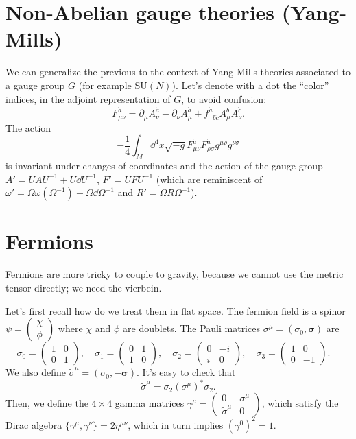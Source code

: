 \documentclass[a4paper,12pt]{book}
\begin{document}
\section{Non-Abelian gauge theories (Yang-Mills)}
We can generalize the previous to the context of Yang-Mills theories associated to a gauge group $G$ (for example $\text{SU}(N)$). Let's denote with a dot the ``color'' indices, in the adjoint representation of $G$, to avoid confusion:
\[F^{\dot a}_{\mu\nu}=\partial_\mu A^{\dot a}_\nu-\partial_\nu A^{\dot a}_\mu+f^{\dot a}{}_{\dot b\dot c}A^{\dot b}_\mu A^{\dot c}_\nu.\]
The action
\[-\frac{1}{4}\int_M\dd^4x\sqrt{-g}F^{\dot a}_{\mu\nu}F^{\dot a}_{\rho\sigma}g^{\mu\rho}g^{\nu\sigma}\]
is invariant under changes of coordinates and the action of the gauge group $A'=UAU^{-1}+U\dd U^{-1}$, $F'=UFU^{-1}$ (which are reminiscent of $\omega'=\Omega\omega(\Omega^{-1})+\Omega\dd\Omega^{-1}$ and $R'=\Omega R\Omega^{-1}$).

\section{Fermions}
Fermions are more tricky to couple to gravity, because we cannot use the metric tensor directly; we need the vierbein.

Let's first recall how do we treat them in flat space. The fermion field is a spinor $\psi=\begin{pmatrix}\chi\\ \phi\end{pmatrix}$ where $\chi$ and $\phi$ are doublets. The Pauli matrices $\sigma^\mu=(\sigma_0,\boldsymbol\sigma)$ are
\[
\sigma_0=\begin{pmatrix}1& 0\\ 0& 1\end{pmatrix},\quad
\sigma_1=\begin{pmatrix}0& 1\\ 1& 0\end{pmatrix},\quad
\sigma_2=\begin{pmatrix}0& -i\\ i& 0\end{pmatrix},\quad
\sigma_3=\begin{pmatrix}1& 0\\ 0& -1\end{pmatrix}.\quad
\]
We also define $\tilde\sigma^\mu=(\sigma_0,-\boldsymbol\sigma)$. It's easy to check that
\begin{equation}
\tilde\sigma^\mu=\sigma_2(\sigma^\mu)^*\sigma_2.
\label{eqn:identitysigmatilde}
\end{equation} Then, we define the $4\times4$ gamma matrices $\gamma^\mu=\begin{pmatrix}0& \sigma^\mu\\ \tilde\sigma^\mu& 0\end{pmatrix}$, which satisfy the Dirac algebra $\{\gamma^\mu,\gamma^\nu\}=2\eta^{\mu\nu}$, which in turn implies $(\gamma^0)^2=1$.
\end{document}
